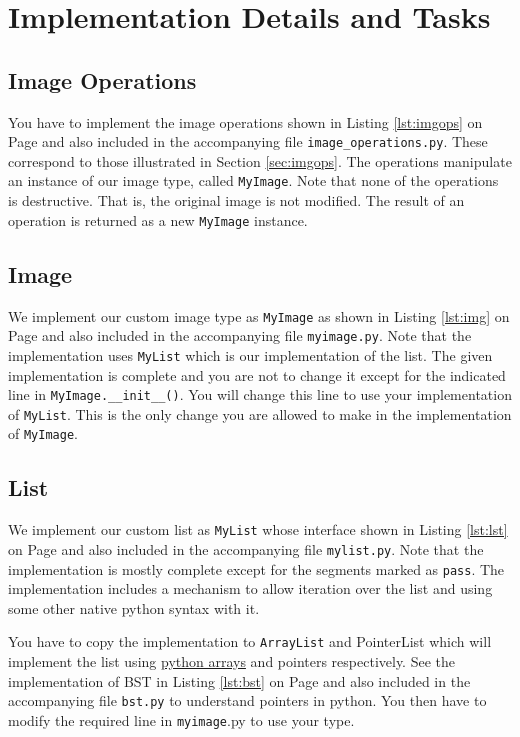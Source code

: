 \documentclass[addpoints]{exam}
\begin{document}
\section{Implementation Details and Tasks}

\subsection{Image Operations}

You have to implement the image operations shown in Listing \ref{lst:imgops} on Page \pageref{lst:imgops} and also included in the accompanying file \texttt{image\_operations.py}. These correspond to those illustrated in Section \ref{sec:imgops}. The operations manipulate an instance of our image type,  called \texttt{MyImage}. Note that none of the operations is destructive. That is, the original image is not modified. The result of an operation is returned as a new \texttt{MyImage} instance. 

\subsection{Image}

We implement our custom image type as \texttt{MyImage} as shown in Listing \ref{lst:img} on Page \pageref{lst:img} and also included in the accompanying file \texttt{myimage.py}. Note that the implementation uses \texttt{MyList} which is our implementation of the list. The given implementation is complete and you are not to change it except for the indicated line in \texttt{MyImage.\_\_init\_\_()}. You will change this line to use your implementation of \texttt{MyList}. This is the only change you are allowed to make in the implementation of \texttt{MyImage}.

\subsection{List}

We implement our custom list as \texttt{MyList} whose interface shown in Listing \ref{lst:lst} on Page \pageref{lst:lst} and also included in the accompanying file \texttt{mylist.py}. Note that the implementation is mostly complete except for the segments marked as \texttt{pass}. The implementation includes a mechanism to allow iteration over the list and using some other native python syntax with it.

You have to copy the implementation to \texttt{ArrayList} and \textsf{PointerList} which will implement the list using \href{https://www.programiz.com/python-programming/array}{python arrays} and pointers respectively. See the implementation of BST in Listing \ref{lst:bst} on Page \pageref{lst:bst} and also included in the accompanying file \texttt{bst.py} to understand pointers in python. You then have to modify the required line in \texttt{myimage}.py to use your type.
\end{document}
